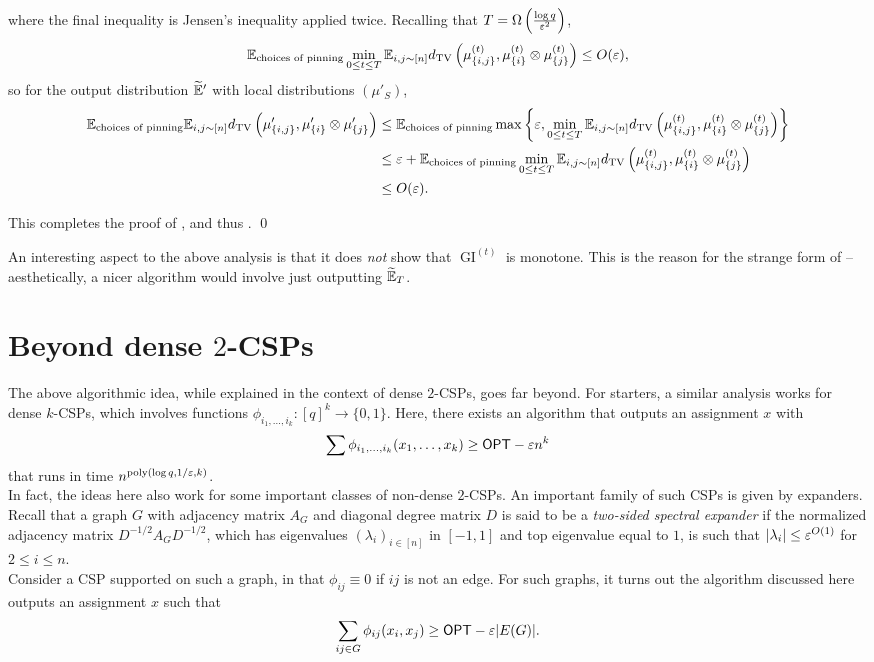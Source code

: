 \documentclass{article}
\newcommand{\GI}{\operatorname{GI}}
\begin{document}
where the final inequality is Jensen's inequality applied twice.
Recalling that $T = \Omega\left( \frac{\log q}{\varepsilon^2} \right)$,
\[ \mathbb{E}_{\text{choices of pinning}} \min_{0 \le t \le T} \mathbb{E}_{i,j \sim [n]} d_{\mathrm{TV}}\left( \mu_{\{i,j\}}^{(t)} , \mu_{\{i\}}^{(t)} \otimes \mu_{\{j\}}^{(t)} \right) \le O(\varepsilon), \]
so for the output distribution $\widetilde{\mathbb{E}}'$ with local distributions $(\mu'_S)$,
\begin{align*}
	\mathbb{E}_{\text{choices of pinning}} \mathbb{E}_{i,j \sim [n]} d_{\mathrm{TV}}\left( \mu'_{\{i,j\}} , \mu'_{\{i\}} \otimes \mu'_{\{j\}} \right) &\le \mathbb{E}_{\text{choices of pinning}} \max \left\{ \varepsilon , \min_{0 \le t \le T} \mathbb{E}_{i,j \sim [n]} d_{\mathrm{TV}}\left( \mu_{\{i,j\}}^{(t)} , \mu_{\{i\}}^{(t)} \otimes \mu_{\{j\}}^{(t)} \right) \right\} \\
		&\le \varepsilon + \mathbb{E}_{\text{choices of pinning}} \min_{0 \le t \le T} \mathbb{E}_{i,j \sim [n]} d_{\mathrm{TV}}\left( \mu_{\{i,j\}}^{(t)} , \mu_{\{i\}}^{(t)} \otimes \mu_{\{j\}}^{(t)} \right) \\
		&\le O(\varepsilon).
\end{align*}

This completes the proof of , and thus . \qed

An interesting aspect to the above analysis is that it does \emph{not} show that $\GI^{(t)}$ is monotone. This is the reason for the strange form of  -- aesthetically, a nicer algorithm would involve just outputting $\widetilde{\mathbb{E}}_{T}$.

\section{Beyond dense $2$-CSPs}

The above algorithmic idea, while explained in the context of dense $2$-CSPs, goes far beyond. For starters, a similar analysis works for dense $k$-CSPs, which involves functions $\phi_{i_1,\ldots,i_k} : [q]^k \to \{0,1\}$. Here, there exists an algorithm that outputs an assignment $x$ with
\[ \sum \phi_{i_1,\ldots,i_k}(x_1,\ldots,x_k) \ge \mathsf{OPT} - \varepsilon n^k \]
that runs in time $n^{\operatorname{poly}(\log q,1/\varepsilon,k)}$.\\

In fact, the ideas here also work for some important classes of non-dense $2$-CSPs. An important family of such CSPs is given by expanders. Recall that a graph $G$ with adjacency matrix $A_G$ and diagonal degree matrix $D$ is said to be a \emph{two-sided spectral expander} if the normalized adjacency matrix $D^{-1/2} A_G D^{-1/2}$, which has eigenvalues $(\lambda_i)_{i \in [n]}$ in $[-1,1]$ and top eigenvalue equal to $1$, is such that $|\lambda_i| \le \varepsilon^{O(1)}$ for $2 \le i \le n$.\\
Consider a CSP supported on such a graph, in that $\phi_{ij} \equiv 0$ if $ij$ is not an edge. For such graphs, it turns out the algorithm discussed here outputs an assignment $x$ such that
\[ \sum_{ij \in G} \phi_{ij}(x_i,x_j) \ge \mathsf{OPT} - \varepsilon |E(G)|. \]
\end{document}
